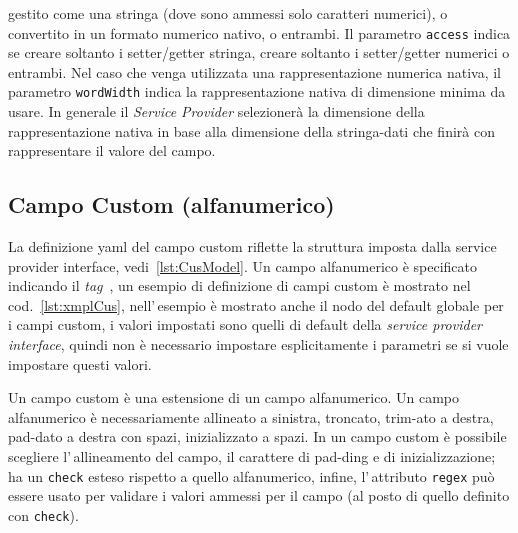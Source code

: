 gestito come una stringa (dove sono ammessi solo caratteri numerici), o 
convertito in un formato numerico nativo, o entrambi. Il parametro 
\texttt{access} indica se creare soltanto i setter/getter stringa, creare 
soltanto i setter/getter numerici o entrambi.
Nel caso che venga utilizzata una rappresentazione numerica nativa, il parametro
\texttt{wordWidth} indica la rappresentazione nativa di dimensione minima da 
usare.
In generale il \textsl{Service Provider} selezionerà la dimensione della
rappresentazione nativa in base alla dimensione della stringa-dati che finirà 
con rappresentare il valore del campo.


\subsection{Campo Custom (alfanumerico)} \label{sub:yaml.cus}
La definizione yaml del campo custom riflette la struttura imposta 
dalla service provider interface, vedi~\ref{lst:CusModel}.
Un campo alfanumerico è specificato indicando il \textsl{tag} 
\,, 
un esempio di definizione di campi custom è mostrato nel 
cod.~\ref{lst:xmplCus}, nell'\,esempio è mostrato anche il nodo del default
globale per i campi custom, i valori impostati sono quelli di default
della \textsl{service provider interface}, quindi non è necessario impostare
esplicitamente i parametri se si vuole impostare questi valori.

Un campo custom è una estensione di un campo alfanumerico. Un campo alfanumerico
è necessariamente allineato a sinistra, troncato, trim-ato a destra, pad-dato a
destra con spazi, inizializzato a spazi. In un campo custom è possibile 
scegliere l'\,allineamento del campo, il carattere di  pad-ding e di 
inizializzazione; ha un \texttt{check} esteso rispetto a quello alfanumerico,
infine, l'\,attributo \texttt{regex} può essere usato per validare i valori
ammessi per il campo (al posto di quello definito con \texttt{check}).

